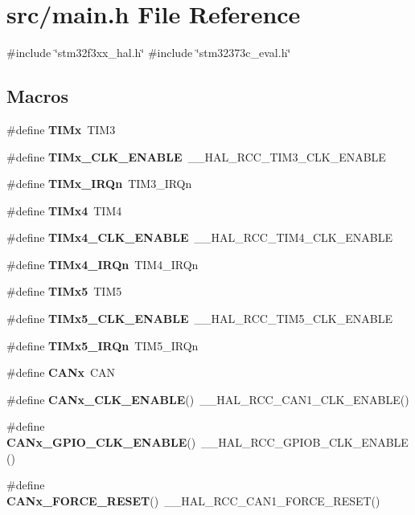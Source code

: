 \section{src/main.h File Reference}
\label{main_8h}
{\ttfamily \#include \char`\"{}stm32f3xx\+\_\+hal.\+h\char`\"{}}\newline
{\ttfamily \#include \char`\"{}stm32373c\+\_\+eval.\+h\char`\"{}}\newline
\subsection*{Macros}
\begin{DoxyCompactItemize}
\item 
\#define \textbf{ T\+I\+Mx}~T\+I\+M3
\item 
\#define \textbf{ T\+I\+Mx\+\_\+\+C\+L\+K\+\_\+\+E\+N\+A\+B\+LE}~\+\_\+\+\_\+\+H\+A\+L\+\_\+\+R\+C\+C\+\_\+\+T\+I\+M3\+\_\+\+C\+L\+K\+\_\+\+E\+N\+A\+B\+LE
\item 
\#define \textbf{ T\+I\+Mx\+\_\+\+I\+R\+Qn}~T\+I\+M3\+\_\+\+I\+R\+Qn
\item 
\#define \textbf{ T\+I\+Mx4}~T\+I\+M4
\item 
\#define \textbf{ T\+I\+Mx4\+\_\+\+C\+L\+K\+\_\+\+E\+N\+A\+B\+LE}~\+\_\+\+\_\+\+H\+A\+L\+\_\+\+R\+C\+C\+\_\+\+T\+I\+M4\+\_\+\+C\+L\+K\+\_\+\+E\+N\+A\+B\+LE
\item 
\#define \textbf{ T\+I\+Mx4\+\_\+\+I\+R\+Qn}~T\+I\+M4\+\_\+\+I\+R\+Qn
\item 
\#define \textbf{ T\+I\+Mx5}~T\+I\+M5
\item 
\#define \textbf{ T\+I\+Mx5\+\_\+\+C\+L\+K\+\_\+\+E\+N\+A\+B\+LE}~\+\_\+\+\_\+\+H\+A\+L\+\_\+\+R\+C\+C\+\_\+\+T\+I\+M5\+\_\+\+C\+L\+K\+\_\+\+E\+N\+A\+B\+LE
\item 
\#define \textbf{ T\+I\+Mx5\+\_\+\+I\+R\+Qn}~T\+I\+M5\+\_\+\+I\+R\+Qn
\item 
\#define \textbf{ C\+A\+Nx}~C\+AN
\item 
\#define \textbf{ C\+A\+Nx\+\_\+\+C\+L\+K\+\_\+\+E\+N\+A\+B\+LE}()~\+\_\+\+\_\+\+H\+A\+L\+\_\+\+R\+C\+C\+\_\+\+C\+A\+N1\+\_\+\+C\+L\+K\+\_\+\+E\+N\+A\+B\+LE()
\item 
\#define \textbf{ C\+A\+Nx\+\_\+\+G\+P\+I\+O\+\_\+\+C\+L\+K\+\_\+\+E\+N\+A\+B\+LE}()~\+\_\+\+\_\+\+H\+A\+L\+\_\+\+R\+C\+C\+\_\+\+G\+P\+I\+O\+B\+\_\+\+C\+L\+K\+\_\+\+E\+N\+A\+B\+LE()
\item 
\#define \textbf{ C\+A\+Nx\+\_\+\+F\+O\+R\+C\+E\+\_\+\+R\+E\+S\+ET}()~\+\_\+\+\_\+\+H\+A\+L\+\_\+\+R\+C\+C\+\_\+\+C\+A\+N1\+\_\+\+F\+O\+R\+C\+E\+\_\+\+R\+E\+S\+ET()

\end{DoxyCompactItemize}
